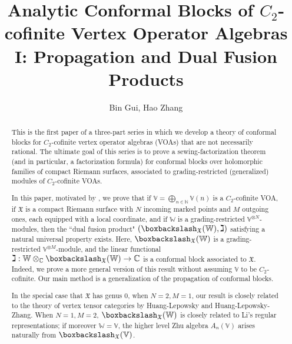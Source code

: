 \documentclass[11pt,b5paper,notitlepage]{article}
\title{Analytic Conformal Blocks of $C_2$-cofinite Vertex Operator Algebras I: Propagation and Dual Fusion Products}
\author{{\sc Bin Gui, Hao Zhang}
}
\date{}
\theoremstyle{definition}
\theoremstyle{plain}
\newcommand{\fk}{\mathfrak}
\newcommand{\Vbb}{\mathbb V}
\newcommand{\Wbb}{\mathbb W}
\newcommand{\Cbb}{\mathbb C}
\newcommand{\Nbb}{\mathbb N}
\newcommand{\<}{\left\langle}
\renewcommand{\>}{\right\rangle}
\newcommand{\fx}{\mathfrak{X}}
\newcommand{\bbs}{\boxbackslash}
\numberwithin{equation}{section}
\begin{document}
\sloppy %
	\setcounter{section}{-1}
	
	
	
	\maketitle
	
	
\newcommand\blfootnote[1]{%
	\begingroup
	\renewcommand\thefootnote{}\footnote{#1}%
	\addtocounter{footnote}{-1}%
	\endgroup
}



\begin{abstract}
This is the first paper of a three-part series in which we develop a theory of conformal blocks for $C_2$-cofinite vertex operator algebras (VOAs) that are not necessarily rational. The ultimate goal of this series is to prove a sewing-factorization theorem (and in particular, a factorization formula) for conformal blocks over holomorphic families of compact Riemann surfaces, associated to grading-restricted (generalized) modules of $C_2$-cofinite VOAs.

In this paper, motivated by \cite{KZ-conformal-block}, we prove that if $\Vbb=\bigoplus_{n\in\Nbb}\Vbb(n)$ is a $C_2$-cofinite VOA, if $\fx$ is a compact Riemann surface with $N$ incoming marked points and $M$ outgoing ones, each  equipped with a local coordinate, and if $\Wbb$ is a grading-restricted $\Vbb^{\otimes N}$-modules, then the ``dual fusion product" $(\bbs_\fx(\Wbb),\gimel)$ satisfying a natural universal property exists. Here, $\bbs_\fx(\Wbb)$ is a grading-restricted $\Vbb^{\otimes M}$-module, and the linear functional $\gimel:\Wbb\otimes_\Cbb\bbs_\fx(\Wbb)\rightarrow\Cbb$ is a conformal block associated to $\fx$. Indeed, we prove a more general version of this result without assuming $\Vbb$ to be $C_2$-cofinite. Our main method is a generalization of the propagation of conformal blocks.

In the special case that $\fk X$ has genus $0$, when $N=2,M=1$, our result is closely related to the theory of vertex tensor categories by Huang-Lepowsky and Huang-Lepowsky-Zhang. When $N=1,M=2$, $\bbs_\fx(\Wbb)$ is closely related to Li's regular representations; if moreover $\Wbb=\Vbb$, the higher level Zhu algebra $A_n(\Vbb)$ arises naturally from $\bbs_\fx(\Vbb)$.
\end{abstract}
\end{document}

